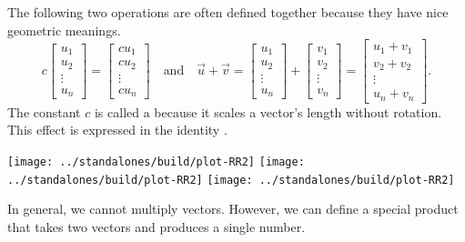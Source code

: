 \documentclass[../main.tex]{subfiles}
\begin{document}
The following two operations are often defined together because they have nice geometric meanings. \begin{equation}
  c
  \begin{bmatrix}
    u_{1} \\ u_{2} \\ \vdots \\ u_{n}
  \end{bmatrix}
  =
  \begin{bmatrix}
    c u_{1} \\ c u_{2} \\ \vdots \\ cu_{n}
  \end{bmatrix}
  \quad\text{and}\quad
  \vec{u} + \vec{v} 
  =
  \begin{bmatrix}
    u_{1} \\ u_{2} \\ \vdots \\ u_{n}
  \end{bmatrix}
  +
  \begin{bmatrix}
    v_{1} \\ v_{2} \\ \vdots \\ v_{n}
  \end{bmatrix}
  =
  \begin{bmatrix}
    u_{1} + v_{1} \\ v_{2} + v_{2} \\ \vdots \\ u_{n} + v_{n}
  \end{bmatrix}.
\end{equation}
The constant \(c\) is called a  because it scales a vector's length without rotation.  This effect is expressed in the identity \underline{\hspace{1.5in}\phantom{\huge X}}.
\bigskip

\texttt{[image: ../standalones/build/plot-RR2]}
\quad
\texttt{[image: ../standalones/build/plot-RR2]}
\quad
\texttt{[image: ../standalones/build/plot-RR2]}

\clearpage

In general, we cannot multiply vectors. However, we can define a special product that takes two vectors and produces a single number. 

\end{document}
